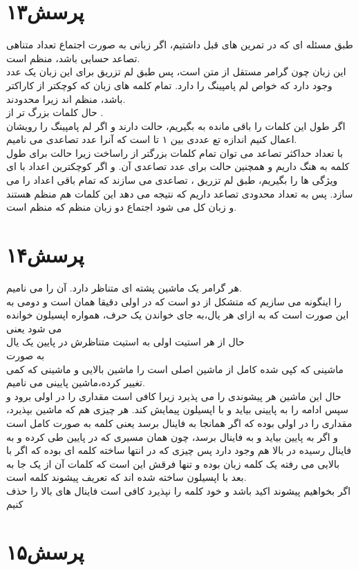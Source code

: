 \documentclass[a4paper]{article}
\begin{document}
\section*{پرسش۱۳}
طبق مسئله ای که در تمرین های قبل داشتیم، اگر زبانی به صورت اجتماع تعداد متناهی تصاعد حسابی باشد، منظم است.\\
این زبان چون گرامر مستقل از متن است، پس طبق لم تزریق 
برای این زبان یک عدد
وجود دارد که خواص لم پامپینگ را دارد.
تمام کلمه های زبان که کوچکتر از
 کاراکتر باشد، منظم اند زیرا محدودند.\\
حال کلمات بزرگ تر از
.\\
اگر طول این کلمات را باقی مانده به 
بگیریم، 
حالت دارند و اگر لم پامپینگ را رویشان اعمال کنیم اندازه
تع عددی بین ۱ تا 
 است که آنرا عدد تصاعدی می نامیم.\\
با تعداد حداکثر
تصاعد می توان تمام کلمات بزرگتر از 
راساخت
زیرا 
حالت برای طول کلمه به هنگ 
داریم و همچنین
حالت برای عدد تصاعدی آن.
و اگر کوچکترین اعداد با ای ویژگی ها را بگیریم، طبق لم تزریق ، تصاعدی می سازند که تمام باقی اعداد را می سازد.
پس به تعداد محدودی تصاعد داریم که نتیجه می دهد این کلمات هم منظم هستند و زبان کل می شود اجتماع دو زبان منظم که منظم است.
\pagebreak
\section*{پرسش۱۴}
هر گرامر یک ماشین پشته ای متناظر دارد. آن را
می نامیم.
\\
را اینگونه می سازیم که متشکل از دو 
 است که در اولی دقیقا همان است و دومی به این صورت است که به ازای هر یال،به جای خواندن یک حرف، همواره اپسیلون خوانده می شود یعنی
\\
حال از هر استیت اولی به استیت متناظرش در پایین یک یال \\به صورت
\\
ماشینی که کپی شده کامل از ماشین اصلی است را ماشین بالایی و ماشینی که کمی تغییر کرده،ماشین پایینی می نامیم.\\
حال این ماشین هر پیشوندی را می پذیرد زیرا کافی است مقداری را در اولی برود و سپس ادامه را به پایینی بیاید و با اپسیلون پیمایش کند.
هر چیزی هم که ماشین بپذیرد، مقداری را در اولی بوده که اگر همانجا به فاینال برسد یعنی کلمه به صورت کامل است و اگر به پایین بیاید و به فاینال برسد، چون همان مسیری که در پایین طی کرده و به فاینال رسیده در بالا هم وجود دارد پس چیزی که در انتها ساخته کلمه ای بوده که اگر با بالایی می رفته یک کلمه زبان بوده و تنها فرقش این است که کلمات آن از یک جا به بعد با اپسیلون ساخته شده اند که تعریف پیشوند کلمه است.\\
اگر بخواهیم پیشوند اکید باشد و خود کلمه را نپذیرد کافی است فاینال های بالا را حذف کنیم
\pagebreak
\section*{پرسش۱۵}
\end{document}

